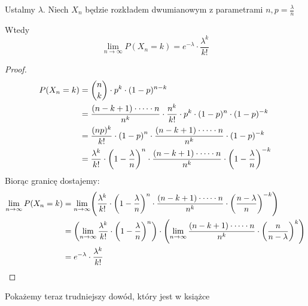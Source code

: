 \begin{theorem}
	Ustalmy \( \lambda \).
	Niech \( X_n \) będzie rozkładem dwumianowym z parametrami \( n,  p = \frac{\lambda}{n} \)

	Wtedy
	\[
		\lim_{n \rightarrow \infty} P(X_n = k) = e^{-\lambda} \cdot \frac{\lambda^k}{k!}
	\]
\end{theorem}
\begin{proof}
	\begin{align*}
		P(X_n = k)
		 & = \binom{n}{k} \cdot p^k \cdot (1-p)^{n-k}                                                                                                       \\
		 & = \frac{(n-k+1)\cdot \dots \cdot n}{n^k} \cdot \frac{n^k}{k!} \cdot p^k \cdot (1-p)^n \cdot (1-p)^{-k}                                           \\
		 & = \frac{(np)^k}{k!} \cdot \left(1 - p\right)^{n} \cdot
		\frac{(n-k+1)\cdot \dots \cdot n}{n^k} \cdot (1-p)^{-k}                                                                                             \\
		 & = \frac{\lambda^k}{k!} \cdot \left(1 - \frac{\lambda}{n}\right)^{n} \cdot \frac{(n-k+1)\cdot \dots \cdot n}{n^k} \cdot \left(1-\frac{\lambda}{n}\right)^{-k} \\
	\end{align*}
	Biorąc granicę dostajemy:
	\begin{align*}
		\lim_{n \rightarrow \infty} P(X_n = k)
		 & =
		\lim_{n \rightarrow \infty} \pars{ \frac{\lambda^k}{k!} \cdot \pars{1 - \frac{\lambda}{n}}^{n} \cdot \frac{(n-k+1)\cdot \dots \cdot n}{n^k} \cdot \pars{\frac{n - \lambda}{n}}^{-k}} \\
		 & = \pars{\lim_{n \rightarrow \infty} \frac{\lambda^k}{k!} \cdot \pars{1 - \frac{\lambda}{n}}^{n}}
		\cdot
		\pars{
			\lim_{n \rightarrow \infty}\frac{(n-k+1)\cdot \dots \cdot n}{n^k} \cdot \pars{\frac{n}{n - \lambda}}^{k}
		}                                                                                                                                                                                    \\
		 & = e^{-\lambda} \cdot \frac{\lambda^k}{k!}
	\end{align*}
\end{proof}

Pokażemy teraz trudniejszy dowód, który jest w książce

